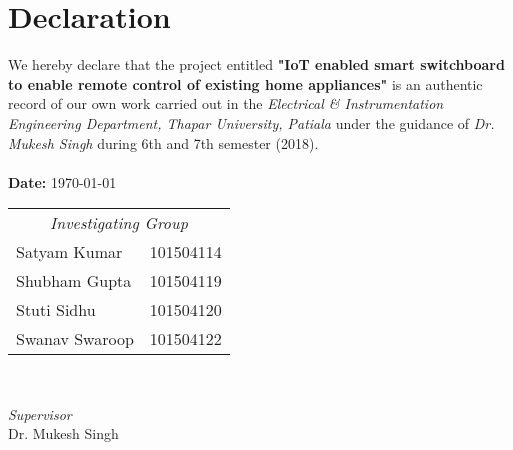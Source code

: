 \chapter*{Declaration}
    
    We hereby declare that the project entitled \textbf{"IoT enabled smart switchboard to enable remote control of existing home appliances"} is an authentic record of our own work carried out in the \textit{Electrical \& Instrumentation Engineering Department, Thapar University, Patiala} under the guidance of \textit{Dr. Mukesh Singh} during 6th and 7th semester (2018).\\\\
    \hspace*{\fill} \textbf{Date: }\today \\
	\vfill
	\vfill
	\begin{minipage}{0.5\textwidth}
		\begin{flushleft}
			\large
				\begin{tabular}{l l}
					\multicolumn{2}{c}{\textit{Investigating Group}} \\
					Satyam Kumar   & 101504114 \\
					Shubham Gupta  & 101504119 \\
					Stuti Sidhu    & 101504120 \\
					Swanav Swaroop & 101504122 \\
				\end{tabular}
			
		\end{flushleft}
	\end{minipage}
	~
	\begin{minipage}{0.4\textwidth}
		\begin{flushright}
			\large
			\textit{Supervisor}\\
			Dr. Mukesh Singh
		\end{flushright}
	\end{minipage}
    \vfill
    
    